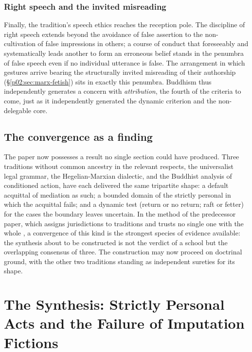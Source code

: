 \subsubsection{Right speech and the invited misreading}
\label{p02:sec:buddhism-speech}

Finally, the tradition's speech ethics reaches the reception pole. The discipline of right speech extends beyond the avoidance of false assertion to the non-cultivation of false impressions in others; a course of conduct that foreseeably and systematically leads another to form an erroneous belief stands in the penumbra of false speech even if no individual utterance is false. The arrangement in which gestures arrive bearing the structurally invited misreading of their authorship (\S\ref{p02:sec:marx-fetish}) sits in exactly this penumbra. Buddhism thus independently generates a concern with \emph{attribution}, the fourth of the criteria to come, just as it independently generated the dynamic criterion and the non-delegable core.

\subsection{The convergence as a finding}
\label{p02:sec:buddhism-convergence}

The paper now possesses a result no single section could have produced. Three traditions without common ancestry in the relevant respects, the universalist legal grammar, the Hegelian-Marxian dialectic, and the Buddhist analysis of conditioned action, have each delivered the same tripartite shape: a default acquittal of mediation as such; a bounded domain of the strictly personal in which the acquittal fails; and a dynamic test (return or no return; raft or fetter) for the cases the boundary leaves uncertain. In the method of the predecessor paper, which assigns jurisdictions to traditions and trusts no single one with the whole \parencite{huang2025toward}, a convergence of this kind is the strongest species of evidence available: the synthesis about to be constructed is not the verdict of a school but the overlapping consensus of three. The construction may now proceed on doctrinal ground, with the other two traditions standing as independent sureties for its shape.
\section{The Synthesis: Strictly Personal Acts and the Failure of Imputation Fictions}
\label{p02:sec:synthesis}


